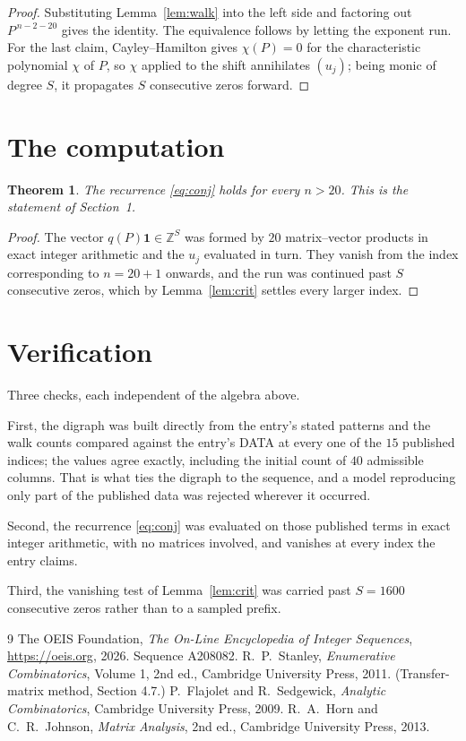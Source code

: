 \documentclass[11pt,a4paper]{article}
\theoremstyle{plain}
\newtheorem{theorem}{Theorem}
\theoremstyle{definition}
\begin{document}
\begin{proof}
Substituting Lemma~\ref{lem:walk} into the left side and factoring out
$P^{\,n-2-20}$ gives the identity. The equivalence follows by letting the exponent
run. For the last claim, Cayley--Hamilton gives $\chi(P)=0$ for the characteristic
polynomial $\chi$ of $P$, so $\chi$ applied to the shift annihilates $(u_j)$; being monic of
degree $S$, it propagates $S$ consecutive zeros forward.
\end{proof}

\section{The computation}

\begin{theorem}
The recurrence \eqref{eq:conj} holds for every $n>20$. This is the statement of
Section~1.
\end{theorem}

\begin{proof}
The vector $q(P)\mathbf{1}\in\mathbb{Z}^{S}$ was formed by $20$ matrix--vector
products in exact integer arithmetic and the $u_j$ evaluated in turn. They vanish from the
index corresponding to $n=20+1$ onwards, and the run was continued past $S$ consecutive
zeros, which by Lemma~\ref{lem:crit} settles every larger index.
\end{proof}

\section{Verification}

Three checks, each independent of the algebra above.

First, the digraph was built directly from the entry's stated patterns and the walk counts
compared against the entry's DATA at every one of the $15$ published indices; the
values agree exactly, including the initial count of $40$ admissible columns. That is
what ties the digraph to the sequence, and a model reproducing only part of the published
data was rejected wherever it occurred.

Second, the recurrence \eqref{eq:conj} was evaluated on those published terms in exact
integer arithmetic, with no matrices involved, and vanishes at every index the entry claims.

Third, the vanishing test of Lemma~\ref{lem:crit} was carried past $S=1600$ consecutive
zeros rather than to a sampled prefix.

\begin{thebibliography}{9}
 The OEIS Foundation, \emph{The On-Line Encyclopedia of Integer
Sequences}, \url{https://oeis.org}, 2026. Sequence A208082.
 R.~P.~Stanley, \emph{Enumerative Combinatorics}, Volume 1, 2nd ed.,
Cambridge University Press, 2011. (Transfer-matrix method, Section 4.7.)
 P.~Flajolet and R.~Sedgewick, \emph{Analytic Combinatorics}, Cambridge
University Press, 2009.
 R.~A.~Horn and C.~R.~Johnson, \emph{Matrix Analysis}, 2nd ed., Cambridge
University Press, 2013.
\end{thebibliography}
\end{document}
